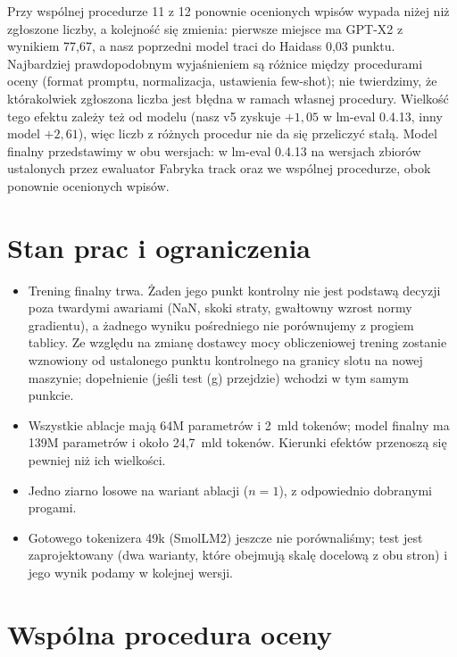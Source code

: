 Przy wspólnej procedurze 11 z 12 ponownie ocenionych wpisów wypada niżej niż zgłoszone liczby, a kolejność się
zmienia: pierwsze miejsce ma GPT-X2 z wynikiem 77,67, a nasz poprzedni model traci do Haidass 0,03 punktu. Najbardziej
prawdopodobnym wyjaśnieniem są różnice między procedurami oceny (format promptu, normalizacja, ustawienia few-shot);
nie twierdzimy, że którakolwiek zgłoszona liczba jest błędna w ramach własnej procedury. Wielkość tego efektu zależy
też od modelu (nasz v5 zyskuje $+1{,}05$ w lm-eval 0.4.13, inny model $+2{,}61$), więc liczb z różnych procedur nie da
się przeliczyć stałą. Model finalny przedstawimy w obu wersjach: w lm-eval 0.4.13 na wersjach zbiorów ustalonych przez
ewaluator Fabryka track oraz we wspólnej procedurze, obok ponownie ocenionych wpisów.

\section{Stan prac i ograniczenia}

\begin{itemize}
  \item Trening finalny trwa. Żaden jego punkt kontrolny nie jest podstawą decyzji poza twardymi awariami (NaN, skoki
  straty, gwałtowny wzrost normy gradientu), a żadnego wyniku pośredniego nie porównujemy z progiem tablicy. Ze względu
  na zmianę dostawcy mocy obliczeniowej trening zostanie wznowiony od ustalonego punktu kontrolnego na granicy slotu
  na nowej maszynie; dopełnienie (jeśli test (g) przejdzie) wchodzi w tym samym punkcie.
  \item Wszystkie ablacje mają 64M parametrów i 2~mld tokenów; model finalny ma 139M parametrów i około 24,7~mld tokenów.
  Kierunki efektów przenoszą się pewniej niż ich wielkości.
  \item Jedno ziarno losowe na wariant ablacji ($n = 1$), z odpowiednio dobranymi progami.
  \item Gotowego tokenizera 49k (SmolLM2) jeszcze nie porównaliśmy; test jest zaprojektowany (dwa warianty, które
  obejmują skalę docelową z obu stron) i jego wynik podamy w kolejnej wersji.
\end{itemize}

\appendix
\section{Wspólna procedura oceny}
\label{app:protocol}

